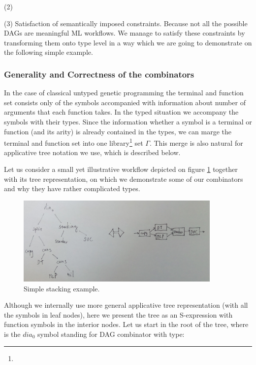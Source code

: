 \documentclass[a4paper,oneside]{memoir}
\begin{document}
(2) 

(3) Satisfaction of semantically imposed constraints. Because not all the possible DAGs are meaningful ML workflows. We manage to satisfy these constraints by transforming them onto type level in a way which we are going to demonstrate on the following simple example.

\subsubsection{Generality and Correctness of the combinators}

In the case of classical untyped genetic programming the terminal and function set consists only of the symbols accompanied with information about number of arguments that each function takes. In the typed situation we accompany the symbols with their types. Since the information whether a symbol is a terminal or function (and its arity) is already contained in the types, we can marge the terminal and function set into one library\footnote{} set $\Gamma$. This merge is also natural for applicative tree notation we use, which is described below.  

Let us consider a small yet illustrative workflow depicted on figure \ref{simple_stacking} together with its tree representation, on which we demonstrate some of our combinators and why they have rather complicated types.

\begin{figure}[th]
\centerline{\includegraphics[width=10cm]{simple_stacking.jpg}}
\vspace*{8pt}
\caption{Simple stacking example.}
\label{simple_stacking}
\end{figure}

Although we internally use more general applicative tree representation (with all the symbols in leaf nodes),
here we present the tree as an S-expression with function symbols in the interior nodes.
Let us start in the root of the tree, where is the $dia_0$ symbol standing for DAG combinator with type:
 
\end{document}
